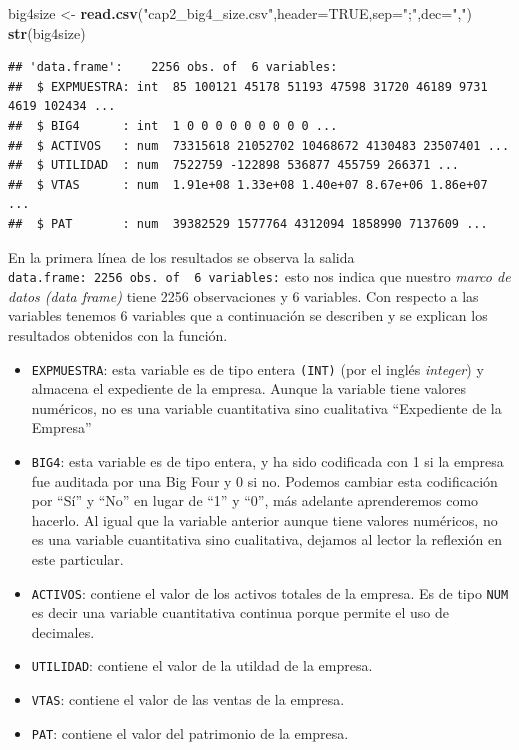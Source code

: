 \documentclass[letterpaper,]{book}
\newenvironment{Shaded}{\begin{snugshade}}{\end{snugshade}}
\newcommand{\DataTypeTok}[1]{\textcolor[rgb]{0.13,0.29,0.53}{#1}}
\newcommand{\KeywordTok}[1]{\textcolor[rgb]{0.13,0.29,0.53}{\textbf{#1}}}
\newcommand{\NormalTok}[1]{#1}
\newcommand{\OtherTok}[1]{\textcolor[rgb]{0.56,0.35,0.01}{#1}}
\newcommand{\StringTok}[1]{\textcolor[rgb]{0.31,0.60,0.02}{#1}}
\providecommand{\tightlist}{%
  \setlength{\itemsep}{0pt}\setlength{\parskip}{0pt}}
\begin{document}
\begin{Shaded}
\begin{Highlighting}[]
\NormalTok{big4size <-}\StringTok{ }\KeywordTok{read.csv}\NormalTok{(}\StringTok{"cap2_big4_size.csv"}\NormalTok{,}\DataTypeTok{header=}\OtherTok{TRUE}\NormalTok{,}\DataTypeTok{sep=}\StringTok{";"}\NormalTok{,}\DataTypeTok{dec=}\StringTok{","}\NormalTok{)}
\KeywordTok{str}\NormalTok{(big4size)}
\end{Highlighting}
\end{Shaded}

\begin{verbatim}
## 'data.frame':    2256 obs. of  6 variables:
##  $ EXPMUESTRA: int  85 100121 45178 51193 47598 31720 46189 9731 4619 102434 ...
##  $ BIG4      : int  1 0 0 0 0 0 0 0 0 0 ...
##  $ ACTIVOS   : num  73315618 21052702 10468672 4130483 23507401 ...
##  $ UTILIDAD  : num  7522759 -122898 536877 455759 266371 ...
##  $ VTAS      : num  1.91e+08 1.33e+08 1.40e+07 8.67e+06 1.86e+07 ...
##  $ PAT       : num  39382529 1577764 4312094 1858990 7137609 ...
\end{verbatim}

En la primera línea de los resultados se observa la salida \texttt{\textquotesingle{}data.frame\textquotesingle{}:\ 2256\ obs.\ of\ \ 6\ variables:} esto nos indica que nuestro \emph{marco de datos (data frame)} tiene 2256 observaciones y 6 variables. Con respecto a las variables tenemos 6 variables que a continuación se describen y se explican los resultados obtenidos con la función.

\begin{itemize}
\tightlist
\item
  \texttt{EXPMUESTRA}: esta variable es de tipo entera \texttt{(INT)} (por el inglés \emph{integer}) y almacena el expediente de la empresa. Aunque la variable tiene valores numéricos, no es una variable cuantitativa sino cualitativa ``Expediente de la Empresa''
\item
  \texttt{BIG4}: esta variable es de tipo entera, y ha sido codificada con 1 si la empresa fue auditada por una Big Four y 0 si no. Podemos cambiar esta codificación por ``Sí'' y ``No'' en lugar de ``1'' y ``0'', más adelante aprenderemos como hacerlo. Al igual que la variable anterior aunque tiene valores numéricos, no es una variable cuantitativa sino cualitativa, dejamos al lector la reflexión en este particular.
\item
  \texttt{ACTIVOS}: contiene el valor de los activos totales de la empresa. Es de tipo \texttt{NUM} es decir una variable cuantitativa continua porque permite el uso de decimales.
\item
  \texttt{UTILIDAD}: contiene el valor de la utildad de la empresa.
\item
  \texttt{VTAS}: contiene el valor de las ventas de la empresa.
\item
  \texttt{PAT}: contiene el valor del patrimonio de la empresa.
\end{itemize}
\end{document}
